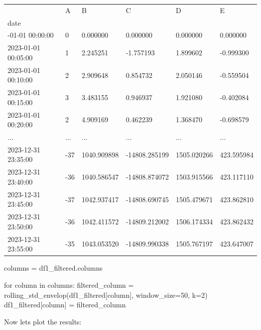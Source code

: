 \documentclass[
  letterpaper,
  DIV=11,
  numbers=noendperiod,
  oneside]{scrreprt}
\newenvironment{Shaded}{\begin{snugshade}}{\end{snugshade}}
\newcommand{\ControlFlowTok}[1]{\textcolor[rgb]{0.00,0.23,0.31}{#1}}
\newcommand{\DecValTok}[1]{\textcolor[rgb]{0.68,0.00,0.00}{#1}}
\newcommand{\KeywordTok}[1]{\textcolor[rgb]{0.00,0.23,0.31}{#1}}
\newcommand{\NormalTok}[1]{\textcolor[rgb]{0.00,0.23,0.31}{#1}}
\newcommand{\OperatorTok}[1]{\textcolor[rgb]{0.37,0.37,0.37}{#1}}
\begin{document}
\begin{longtable}[]{@{}llllll@{}}
\toprule\noalign{}
& A & B & C & D & E \\
date & & & & & \\
\midrule\noalign{}
\endhead
\bottomrule\noalign{}
\endlastfoot
2023-01-01 00:00:00 & 0 & 0.000000 & 0.000000 & 0.000000 & 0.000000 \\
2023-01-01 00:05:00 & 1 & 2.245251 & -1.757193 & 1.899602 & -0.999300 \\
2023-01-01 00:10:00 & 2 & 2.909648 & 0.854732 & 2.050146 & -0.559504 \\
2023-01-01 00:15:00 & 3 & 3.483155 & 0.946937 & 1.921080 & -0.402084 \\
2023-01-01 00:20:00 & 2 & 4.909169 & 0.462239 & 1.368470 & -0.698579 \\
... & ... & ... & ... & ... & ... \\
2023-12-31 23:35:00 & -37 & 1040.909898 & -14808.285199 & 1505.020266 &
423.595984 \\
2023-12-31 23:40:00 & -36 & 1040.586547 & -14808.874072 & 1503.915566 &
423.117110 \\
2023-12-31 23:45:00 & -37 & 1042.937417 & -14808.690745 & 1505.479671 &
423.862810 \\
2023-12-31 23:50:00 & -36 & 1042.411572 & -14809.212002 & 1506.174334 &
423.862432 \\
2023-12-31 23:55:00 & -35 & 1043.053520 & -14809.990338 & 1505.767197 &
423.647007 \\
\end{longtable}

\begin{Shaded}
\begin{Highlighting}[]
\NormalTok{columns }\OperatorTok{=}\NormalTok{ df1\_filtered.columns}

\ControlFlowTok{for}\NormalTok{ column }\KeywordTok{in}\NormalTok{ columns:}
\NormalTok{    filtered\_column }\OperatorTok{=}\NormalTok{ rolling\_std\_envelop(df1\_filtered[column], window\_size}\OperatorTok{=}\DecValTok{50}\NormalTok{, k}\OperatorTok{=}\DecValTok{2}\NormalTok{)}
\NormalTok{    df1\_filtered[column] }\OperatorTok{=}\NormalTok{ filtered\_column}
\end{Highlighting}
\end{Shaded}

Now lets plot the results:
\end{document}
